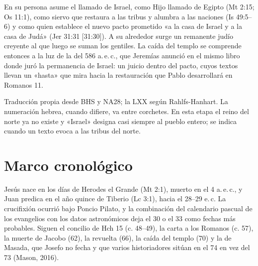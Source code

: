En su persona asume el llamado de Israel, como Hijo llamado de Egipto (Mt 2:15; Os 11:1), como siervo que restaura a las tribus y alumbra a las naciones (Is 49:5–6) y como quien establece el nuevo pacto prometido «a la casa de Israel y a la casa de Judá» (Jer 31:31 [31:30]). A su alrededor surge un remanente judío creyente al que luego se suman los gentiles. La caída del templo se comprende entonces a la luz de la del 586 a.\,e.\,c., que Jeremías anunció en el mismo libro donde juró la permanencia de Israel: un juicio dentro del pacto, cuyos textos llevan un «hasta» que mira hacia la restauración que Pablo desarrollará en Romanos 11.

\begin{nota}
Traducción propia desde BHS y NA28; la LXX según Rahlfs-Hanhart. La numeración hebrea, cuando difiere, va entre corchetes. En esta etapa el reino del norte ya no existe y «Israel» designa casi siempre al pueblo entero; se indica cuando un texto evoca a las tribus del norte.
\end{nota}

\section{Marco cronológico}

Jesús nace en los días de Herodes el Grande (Mt 2:1), muerto en el 4 a.\,e.\,c., y Juan predica en el año quince de Tiberio (Lc 3:1), hacia el 28--29 e.\,c. La crucifixión ocurrió bajo Poncio Pilato, y la combinación del calendario pascual de los evangelios con los datos astronómicos deja el 30 o el 33 como fechas más probables. Siguen el concilio de Hch 15 (c. 48--49), la carta a los Romanos (c. 57), la muerte de Jacobo (62), la revuelta (66), la caída del templo (70) y la de Masada, que Josefo no fecha y que varios historiadores sitúan en el 74 en vez del 73 (Mason, 2016).

